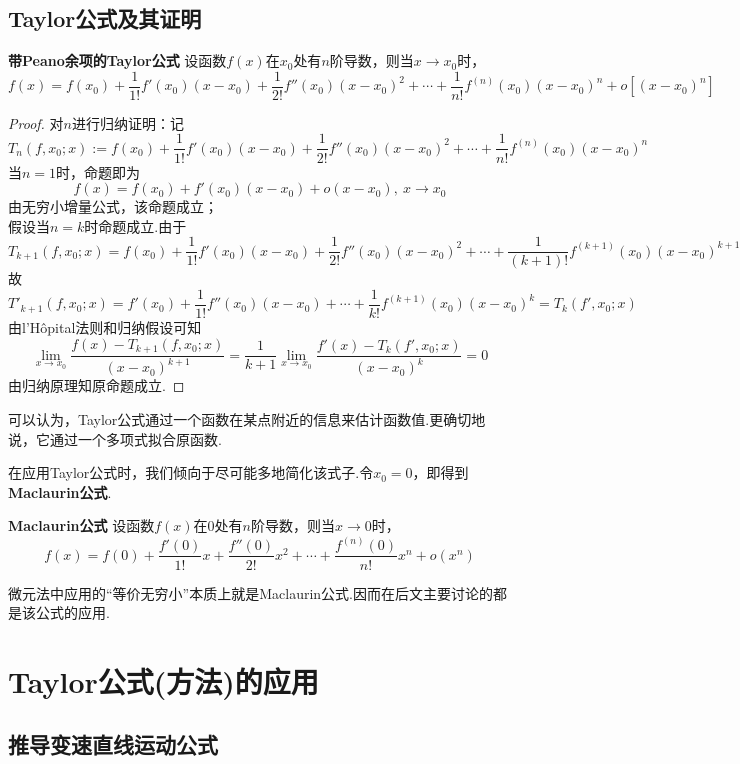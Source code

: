 \section{Taylor公式及其证明}
\begin{theorem}{\textbf{带Peano余项的Taylor公式}\cite{ayumu}}
	设函数$f(x)$在$x_0$处有$n$阶导数，则当$x \to x_0$时，$$f(x) = f(x_0) + \frac{1}{1!}f'(x_0)(x-x_0) + \frac{1}{2!}f''(x_0)(x-x_0)^2 + \cdots + \frac{1}{n!}f^{(n)}(x_0)(x-x_0)^n + o[(x-x_0)^n]$$
\end{theorem}
\begin{proof}
	对$n$进行归纳证明：记$$T_{n}(f,x_0;x):=f(x_0) + \frac{1}{1!}f'(x_0)(x-x_0) + \frac{1}{2!}f''(x_0)(x-x_0)^2 + \cdots + \frac{1}{n!}f^{(n)}(x_0)(x-x_0)^n$$
	当$n=1$时，命题即为$$f(x)=f(x_0)+f'(x_0)(x-x_0)+o(x-x_0),~x \to x_0$$
	由无穷小增量公式，该命题成立； \\
	假设当$n=k$时命题成立.由于
	$$T_{k+1}(f,x_0;x)=f(x_0) + \frac{1}{1!}f'(x_0)(x-x_0) + \frac{1}{2!}f''(x_0)(x-x_0)^2 + \cdots + \frac{1}{(k+1)!}f^{(k+1)}(x_0)(x-x_0)^{k+1}$$
	故
	$$T'_{k+1}(f,x_0;x)=f'(x_0) + \frac{1}{1!}f''(x_0)(x-x_0) + \cdots + \frac{1}{k!}f^{(k+1)}(x_0)(x-x_0)^{k} = T_k(f',x_0;x)$$
	由l’Hôpital法则和归纳假设可知$$\lim_{x \to x_0} \frac{f(x)-T_{k+1}(f,x_0;x)}{(x-x_0)^{k+1}} = \frac{1}{k+1} \lim_{x \to x_0} \frac{f'(x)-T_{k}(f',x_0;x)}{(x-x_0)^{k}} = 0$$
	由归纳原理知原命题成立.
\end{proof}

可以认为，Taylor公式通过一个函数在某点附近的信息来估计函数值.更确切地说，它通过一个多项式拟合原函数.

在应用Taylor公式时，我们倾向于尽可能多地简化该式子.令$x_0=0$，即得到\textbf{Maclaurin公式}.

\begin{corollary}{\textbf{Maclaurin公式}}
	设函数$f(x)$在$0$处有$n$阶导数，则当$x \to 0$时，$$f(x)=f(0)+\frac{f'(0)}{1!}x + \frac{f''(0)}{2!}x^2 + \cdots + \frac{f^{(n)}(0)}{n!}x^n + o(x^n)$$
\end{corollary}

微元法中应用的“等价无穷小”本质上就是Maclaurin公式.因而在后文主要讨论的都是该公式的应用.


\chapter{Taylor公式(方法)的应用}

\section{推导变速直线运动公式}

